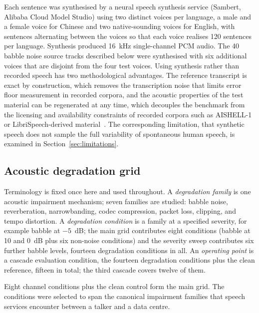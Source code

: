 Each sentence was synthesised by a neural speech synthesis service (Sambert,
Alibaba Cloud Model Studio) using two distinct voices per language, a male
and a female voice for Chinese and two native-sounding voices for English,
with sentences alternating between the voices so that each voice realises 120
sentences per language. Synthesis produced 16~kHz single-channel PCM audio.
The 40 babble noise source tracks described below were synthesised with
six additional voices that are disjoint from the four test voices. Using
synthesis rather than recorded speech has two methodological advantages. The
reference transcript is exact by construction, which removes the transcription
noise that limits error floor measurement in recorded corpora, and the
acoustic properties of the test material can be regenerated at any time,
which decouples the benchmark from the licensing and availability constraints
of recorded corpora such as AISHELL-1~\citep{bu2017aishell} or
LibriSpeech-derived material~\citep{zen2019libritts}. The corresponding
limitation, that synthetic speech does not sample the full variability of
spontaneous human speech, is examined in Section~\ref{sec:limitations}.

\subsection{Acoustic degradation grid}

Terminology is fixed once here and used throughout. A \emph{degradation
family} is one acoustic impairment mechanism; seven families are studied:
babble noise, reverberation, narrowbanding, codec compression, packet loss,
clipping, and tempo distortion. A \emph{degradation condition} is a family
at a specified severity, for example babble at $-5$~dB; the main grid
contributes eight conditions (babble at 10 and 0~dB plus six non-noise
conditions) and the severity sweep contributes six further babble levels,
fourteen degradation conditions in all. An \emph{operating point} is a
cascade evaluation condition, the fourteen degradation conditions plus the
clean reference, fifteen in total; the third cascade covers twelve of them.

Eight channel conditions plus the clean control form the main grid. The
conditions were selected to span the canonical impairment families that
speech services encounter between a talker and a data centre.

